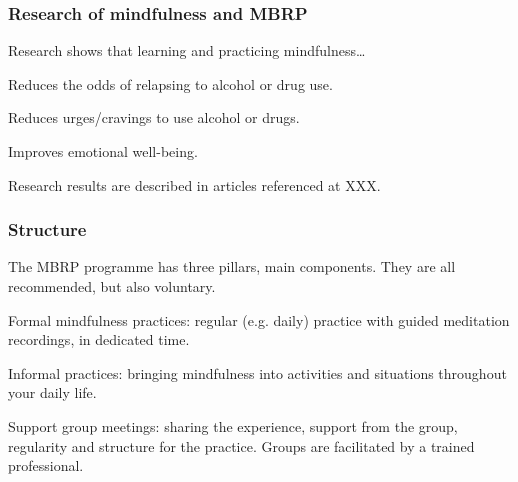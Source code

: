 	\subsubsection*{Research of mindfulness and MBRP}
		Research shows that learning and practicing mindfulness…
			\begin{itemize*}
				\item[\DOWNarrow] Reduces the odds of relapsing to alcohol or drug use.
				\item[\DOWNarrow] Reduces urges/cravings to use alcohol or drugs.
				\item[\UParrow] Improves emotional well-being.
			\end{itemize*}
		Research results are described in articles referenced at XXX.

	\subsubsection*{Structure}
	The MBRP programme has three pillars, main components. They are all recommended, but also voluntary.
	\begin{description*}
    	\item[Formal mindfulness practices:] regular (e.g. daily) practice with guided meditation recordings, in dedicated time.
		\item[Informal practices:] bringing mindfulness into activities and situations throughout your daily life.
    	\item[Support group meetings:] sharing the experience, support from the group, regularity and structure for the practice. Groups are facilitated by a trained professional.
	\end{description*}
		


